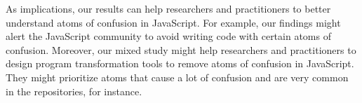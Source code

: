 As implications, our results can help researchers and practitioners to better understand atoms of confusion in JavaScript. For example, our findings might alert the JavaScript community to avoid writing code with certain atoms of confusion. Moreover, our mixed study might help researchers and practitioners to design program transformation tools to remove atoms of confusion in JavaScript. They might prioritize atoms that cause a lot of confusion and are very common in the repositories, for instance.











